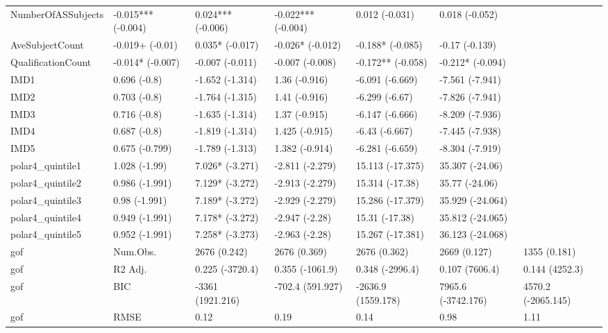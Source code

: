 \begin{longtable}{lllllll}
NumberOfASSubjects & -0.015*** 
 (-0.004) & 0.024*** 
 (-0.006) & -0.022*** 
 (-0.004) & 0.012 
 (-0.031) & 0.018 
 (-0.052) \\
AveSubjectCount & -0.019+ 
 (-0.01) & 0.035* 
 (-0.017) & -0.026* 
 (-0.012) & -0.188* 
 (-0.085) & -0.17 
 (-0.139) \\
QualificationCount & -0.014* 
 (-0.007) & -0.007 
 (-0.011) & -0.007 
 (-0.008) & -0.172** 
 (-0.058) & -0.212* 
 (-0.094) \\
IMD1 & 0.696 
 (-0.8) & -1.652 
 (-1.314) & 1.36 
 (-0.916) & -6.091 
 (-6.669) & -7.561 
 (-7.941) \\
IMD2 & 0.703 
 (-0.8) & -1.764 
 (-1.315) & 1.41 
 (-0.916) & -6.299 
 (-6.67) & -7.826 
 (-7.941) \\
IMD3 & 0.716 
 (-0.8) & -1.635 
 (-1.314) & 1.37 
 (-0.915) & -6.147 
 (-6.666) & -8.209 
 (-7.936) \\
IMD4 & 0.687 
 (-0.8) & -1.819 
 (-1.314) & 1.425 
 (-0.915) & -6.43 
 (-6.667) & -7.445 
 (-7.938) \\
IMD5 & 0.675 
 (-0.799) & -1.789 
 (-1.313) & 1.382 
 (-0.914) & -6.281 
 (-6.659) & -8.304 
 (-7.919) \\
polar4\_quintile1 & 1.028 
 (-1.99) & 7.026* 
 (-3.271) & -2.811 
 (-2.279) & 15.113 
 (-17.375) & 35.307 
 (-24.06) \\
polar4\_quintile2 & 0.986 
 (-1.991) & 7.129* 
 (-3.272) & -2.913 
 (-2.279) & 15.314 
 (-17.38) & 35.77 
 (-24.06) \\
polar4\_quintile3 & 0.98 
 (-1.991) & 7.189* 
 (-3.272) & -2.929 
 (-2.279) & 15.286 
 (-17.379) & 35.929 
 (-24.064) \\
polar4\_quintile4 & 0.949 
 (-1.991) & 7.178* 
 (-3.272) & -2.947 
 (-2.28) & 15.31 
 (-17.38) & 35.812 
 (-24.065) \\
polar4\_quintile5 & 0.952 
 (-1.991) & 7.258* 
 (-3.273) & -2.963 
 (-2.28) & 15.267 
 (-17.381) & 36.123 
 (-24.068) \\
gof & Num.Obs. & 2676 
 (0.242) & 2676 
 (0.369) & 2676 
 (0.362) & 2669 
 (0.127) & 1355 
 (0.181) \\
gof & R2 Adj. & 0.225 
 (-3720.4) & 0.355 
 (-1061.9) & 0.348 
 (-2996.4) & 0.107 
 (7606.4) & 0.144 
 (4252.3) \\
gof & BIC & -3361 
 (1921.216) & -702.4 
 (591.927) & -2636.9 
 (1559.178) & 7965.6 
 (-3742.176) & 4570.2 
 (-2065.145) \\
gof & RMSE & 0.12 & 0.19 & 0.14 & 0.98 & 1.11 \\
\end{longtable}
